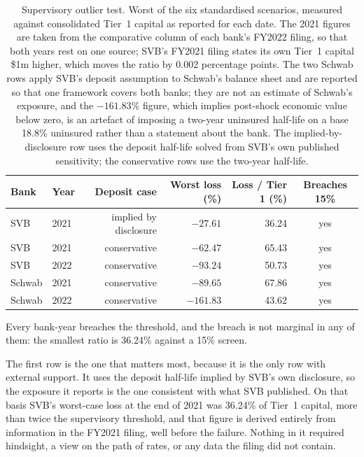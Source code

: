 \begin{table}[htbp]
\centering
\caption{Supervisory outlier test. Worst of the six standardised scenarios, measured
against consolidated Tier~1 capital as reported for each date. The 2021 figures are
taken from the comparative column of each bank's FY2022 filing, so that both years
rest on one source; SVB's FY2021 filing states its own Tier~1 capital \$1m higher,
which moves the ratio by 0.002 percentage points. The two Schwab rows apply SVB's
deposit assumption to Schwab's balance sheet and are reported so that one framework
covers both banks; they are not an estimate of Schwab's exposure, and the
$-161.83\%$ figure, which implies post-shock economic value below zero, is an
artefact of imposing a two-year uninsured half-life on a base 18.8\% uninsured rather
than a statement about the bank. The implied-by-disclosure row uses
the deposit half-life solved from SVB's own published sensitivity; the conservative
rows use the two-year half-life.}
\label{tab:outlier}
\small
\begin{tabular}{llrrrc}
\toprule
Bank & Year & Deposit case & Worst loss (\%) & Loss / Tier 1 (\%) & Breaches 15\% \\
\midrule
SVB    & 2021 & implied by disclosure & $-27.61$  & 36.24 & yes \\
SVB    & 2021 & conservative          & $-62.47$  & 65.43 & yes \\
SVB    & 2022 & conservative          & $-93.24$  & 50.73 & yes \\
Schwab & 2021 & conservative          & $-89.65$  & 67.86 & yes \\
Schwab & 2022 & conservative          & $-161.83$ & 43.62 & yes \\
\bottomrule
\end{tabular}
\end{table}

Every bank-year breaches the threshold, and the breach is not marginal in any of them:
the smallest ratio is 36.24\% against a 15\% screen.

The first row is the one that matters most, because it is the only row with external
support. It uses the deposit half-life implied by SVB's own disclosure, so the
exposure it reports is the one consistent with what SVB published. On that basis
SVB's worst-case loss at the end of 2021 was 36.24\% of Tier~1 capital, more than
twice the supervisory threshold, and that figure is derived entirely from
information in the FY2021 filing, well before the failure. Nothing in
it required hindsight, a view on the path of rates, or any data the filing did not
contain.

